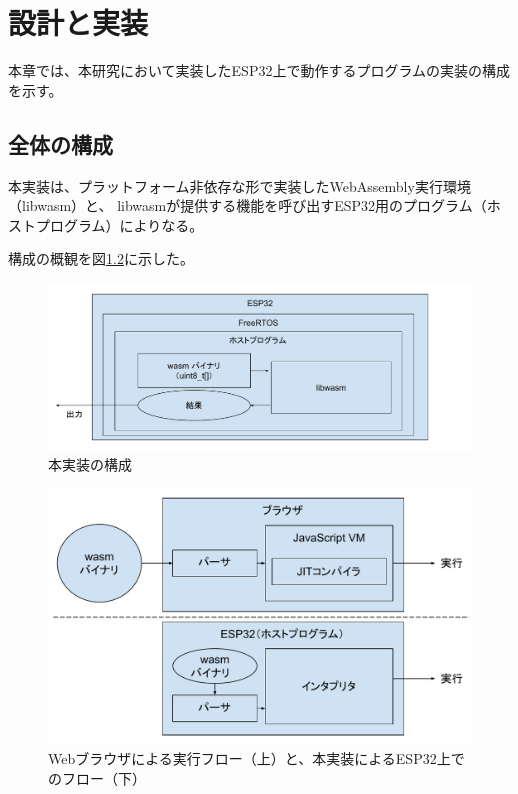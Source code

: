 \chapter{設計と実装}
\label{chap:implementation}

本章では、本研究において実装したESP32上で動作するプログラムの実装の構成を示す。

\section{全体の構成}

本実装は、プラットフォーム非依存な形で実装したWebAssembly実行環境（libwasm）と、
libwasmが提供する機能を呼び出すESP32用のプログラム（ホストプログラム）によりなる。

構成の概観を図\ref{fig:esp32_libwasm}に示した。

\begin{figure}[htbp]
  \caption{本実装の構成}
  \label{fig:esp32_libwasm}
  \begin{center}
    \includegraphics[bb=0 0 800 300,width=12cm]{img/esp32_libwasm.pdf}
  \end{center}
\end{figure}

\begin{figure}[htbp]
  \caption{Webブラウザによる実行フロー（上）と、本実装によるESP32上でのフロー（下）}
  \label{fig:esp32_libwasm}
  \begin{center}
    \includegraphics[bb=0 0 706 427,width=15cm]{img/browser_vs_libwasm.pdf}
  \end{center}
\end{figure}

